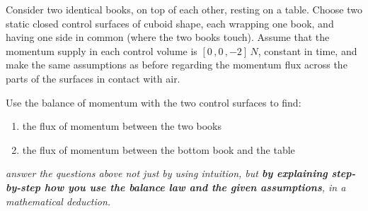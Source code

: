 \documentclass[a4paper,12pt,%
onecolumn,oneside,%
british%
]{memoir}
\renewcommand*{\|}[1][]{\nonscript\:#1\vert\nonscript\:\mathopen{}}
\begin{document}
\begin{exercise}[label={ex:twobooks}]
  Consider two identical books, on top of each other, resting on a table. Choose two static closed control surfaces of cuboid shape, each wrapping one book, and having one side in common (where the two books touch). Assume that the momentum supply in each control volume is $[0\,,0\,,\num{-2}]\,\unit{N}$, constant in time, and make the same assumptions as before regarding the momentum flux across the parts of the surfaces in contact with air.

  Use the balance of momentum with the two control surfaces to find:
\begin{enumerate}[exerc]
\item the flux of momentum between the two books
\item the flux of momentum between the bottom book and the table
\end{enumerate}
  {\itshape answer the questions above not just by using intuition, but \textbf{by explaining step-by-step how you use the balance law and the given assumptions}, in a mathematical deduction.}
\end{exercise}
%
\end{document}
